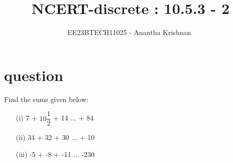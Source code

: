 \documentclass[journal,12pt,twocolumn]{IEEEtran}
\theoremstyle{remark}
\begin{document}

\vspace{3cm}

\title{NCERT-discrete : 10.5.3 - 2}
\author{EE23BTECH11025 - Anantha Krishnan $^{}$%
}
\maketitle
\newpage
\bigskip

\renewcommand{\thefigure}{\theenumi}
\renewcommand{\thetable}{\theenumi}

\section{question}
\vspace{0.5cm}
Find the sums given below:
\begin{enumerate}
    \item[(i)] 7 + $10\dfrac{1}{2}$ + 14 ... + 84
    \item[(ii)] 34 + 32 + 30 ... + 10

    \item[(iii)] -5 + -8 + -11 ... -230

\end{enumerate}
\end{document}
